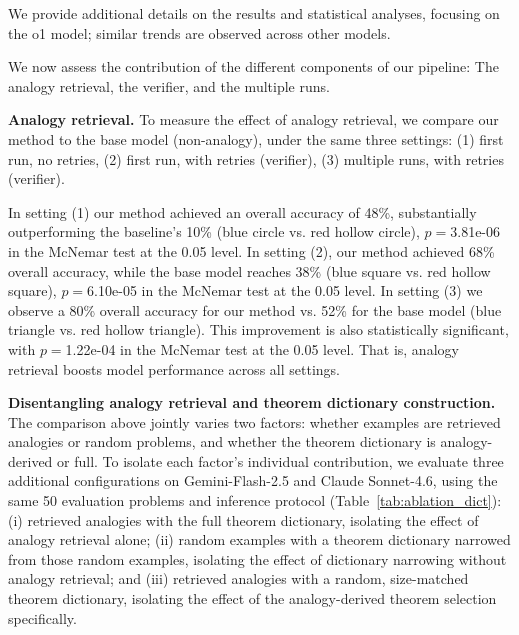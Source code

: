 


We provide additional details on the results and statistical analyses, focusing on the o1 model; similar trends are observed across other models.

We now assess the contribution of the different components of our pipeline: The analogy retrieval, the verifier, and the multiple runs.

\noindent\textbf{Analogy retrieval.}
To measure the effect of analogy retrieval, we compare our method to the base model (non-analogy), under the same three settings:
(1) first run, no retries,
(2) first run, with retries (verifier),
(3) multiple runs, with retries (verifier). 

In setting (1) our method achieved an overall accuracy of 48\%, substantially outperforming the baseline's 10\% (blue circle vs. red hollow circle), $p=$3.81e-06 in the McNemar test at the 0.05 level. %
In setting (2), our method achieved 68\% overall accuracy, while the base model reaches 38\% (blue square vs. red hollow square), $p=$6.10e-05 in the McNemar test at the  0.05 level. %
In setting (3) we observe a 80\% overall accuracy for our method vs. 52\% for the base model (blue triangle vs. red hollow triangle). This improvement is also statistically significant, with $p=$1.22e-04 in the McNemar test at the  0.05 level. 
That is, analogy retrieval boosts model performance across all settings.


\noindent\textbf{Disentangling analogy retrieval and theorem dictionary construction.}
The comparison above jointly varies two factors: whether examples are retrieved analogies or random problems, and whether the theorem dictionary is analogy-derived or full. To isolate each factor's individual contribution, we evaluate three additional configurations on Gemini-Flash-2.5 and Claude Sonnet-4.6, using the same 50 evaluation problems and inference protocol (Table~\ref{tab:ablation_dict}): (i) retrieved analogies with the full theorem dictionary, isolating the effect of analogy retrieval alone; (ii) random examples with a theorem dictionary narrowed from those random examples, isolating the effect of dictionary narrowing without analogy retrieval; and (iii) retrieved analogies with a random, size-matched theorem dictionary, isolating the effect of the analogy-derived theorem selection specifically.

